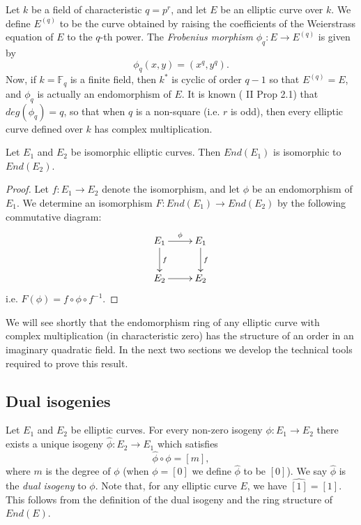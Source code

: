 \begin{example}
  \label{ex:finite-field-cm}
  Let $k$ be a field of characteristic $q = p^{r}$, and let $E$ be an elliptic curve
  over $k$.  We define $E^{(q)}$ to be the curve obtained by raising the coefficients
  of the Weierstrass equation of $E$ to the $q$-th power.  The \emph{Frobenius
    morphism} $\phi_{q} : E \rightarrow E^{(q)}$ is given by
  \begin{equation*}
    \phi_{q}(x,y) = (x^{q},y^{q}).
  \end{equation*}
  Now, if $k = \mathbb{F}_{q}$ is a finite field, then $k^{*}$ is cyclic of order $q
  - 1$ so that $E^{(q)} = E$, and $\phi_{q}$ is actually an endomorphism of $E$.  It
  is known (\cite{silverman86} II Prop 2.1) that $deg(\phi_{q}) = q$, so that when
  $q$ is a non-square (i.e. $r$ is odd), then every elliptic curve defined over $k$
  has complex multiplication.
\end{example}

\begin{prop}
  \label{prop:iso-curves-iso-end-rings}
  Let $E_{1}$ and $E_{2}$ be isomorphic elliptic curves.  Then $End(E_{1})$ is
  isomorphic to $End(E_{2})$.
\end{prop}
\begin{proof}
  Let $f \colon E_{1} \rightarrow E_{2}$ denote the isomorphism, and let $\phi$ be an
  endomorphism of $E_{1}$. We determine an isomorphism $F \colon End(E_{1}) \rightarrow
  End(E_{2})$ by the following commutative diagram:
\begin{equation*}
\xymatrix{
  E_{1} \ar[d]^{f} \ar[r]^{\phi} & E_{1} \ar[d]^{f} \\
  E_{2} \ar[r] & E_{2}}
\end{equation*}
i.e. $F(\phi) = f \circ \phi \circ f^{-1}$.
\end{proof}
We will see shortly that the endomorphism ring of any elliptic curve with complex
multiplication (in characteristic zero) has the structure of an order in an imaginary
quadratic field.  In the next two sections we develop the technical tools required to
prove this result.

\subsection{Dual isogenies}
\label{sec:an-interlude-dual}

Let $E_{1}$ and $E_{2}$ be elliptic curves.  For every non-zero isogeny $\phi \colon
E_{1} \rightarrow E_{2}$ there exists a unique isogeny $\hat{\phi} \colon E_{2}
\rightarrow E_{1}$ which satisfies
\begin{equation}
  \label{eq:dual-isogeny}
  \hat{\phi} \circ \phi = \left[ m \right],
\end{equation}
where $m$ is the degree of $\phi$ (when $\phi = \left[ 0 \right]$ we define
$\hat{\phi}$ to be $\left[ 0 \right]$).  We say $\hat{\phi}$ is the \emph{dual
  isogeny} to $\phi$.  Note that, for any elliptic curve $E$, we have $\widehat{[1]}
= [1]$.  This follows from the definition of the dual isogeny and the ring structure
of $End(E)$.

